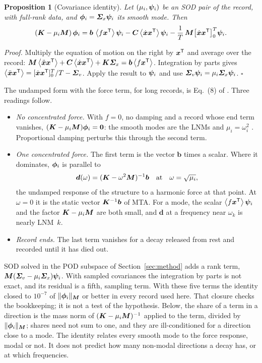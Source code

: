 \documentclass[preprint,12pt]{elsarticle}
\newtheorem{proposition}{Proposition}
\begin{document}
\begin{proposition}[Covariance identity]\label{prop:identity}
Let $(\mu_i,\bm{\psi}_i)$ be an SOD pair of the record, with full-rank data, and $\bm{\phi}_i=\bm{\varSigma}_x\bm{\psi}_i$ its smooth mode. Then
\begin{equation}
(\bm{K}-\mu_i\bm{M})\,\bm{\phi}_i=\bm{b}\,\left\langle f\bm{x}^{\mathsf T} \right\rangle\bm{\psi}_i-\bm{C}\left\langle \dot{\bm{x}}\bm{x}^{\mathsf T} \right\rangle\bm{\psi}_i-\frac1T\,\bm{M}\big[\dot{\bm{x}}\bm{x}^{\mathsf T}\big]_0^T\bm{\psi}_i .
\label{eq:identity}
\end{equation}
\end{proposition}
\noindent\emph{Proof.} Multiply the equation of motion on the right by $\bm{x}^{\mathsf T}$ and average over the record: $\bm{M}\left\langle \ddot{\bm{x}}\bm{x}^{\mathsf T} \right\rangle+\bm{C}\left\langle \dot{\bm{x}}\bm{x}^{\mathsf T} \right\rangle+\bm{K}\bm{\varSigma}_x=\bm{b}\left\langle f\bm{x}^{\mathsf T} \right\rangle$. Integration by parts gives $\left\langle \ddot{\bm{x}}\bm{x}^{\mathsf T} \right\rangle=[\dot{\bm{x}}\bm{x}^{\mathsf T}]_0^T/T-\bm{\varSigma}_v$. Apply the result to $\bm{\psi}_i$ and use $\bm{\varSigma}_v\bm{\psi}_i=\mu_i\bm{\varSigma}_x\bm{\psi}_i$. \hfill$\square$

The undamped form with the force term, for long records, is Eq.~(8) of \citet{Farooq2008}. Three readings follow.
\begin{itemize}
\item \emph{No concentrated force.} With $f=0$, no damping and a record whose end term vanishes, $(\bm{K}-\mu_i\bm{M})\bm{\phi}_i=\mathbf 0$: the smooth modes are the LNMs and $\mu_i=\omega_i^2$ \citep{Chelidze2006}. Proportional damping perturbs this through the second term.
\item \emph{One concentrated force.} The first term is the vector $\bm{b}$ times a scalar. Where it dominates, $\bm{\phi}_i$ is parallel to
\begin{equation}
\bm{d}(\omega)=(\bm{K}-\omega^2\bm{M})^{-1}\bm{b}\quad\text{at}\quad\omega=\sqrt{\mu_i},
\label{eq:d}
\end{equation}
the undamped response of the structure to a harmonic force at that point. At $\omega=0$ it is the static vector $\bm{K}^{-1}\bm{b}$ of MTA. For a mode, the scalar $\left\langle f\bm{x}^{\mathsf T} \right\rangle\bm{\psi}_i$ and the factor $\bm{K}-\mu_i\bm{M}$ are both small, and $\bm{d}$ at a frequency near $\omega_k$ is nearly LNM~$k$.
\item \emph{Record ends.} The last term vanishes for a decay released from rest and recorded until it has died out.
\end{itemize}
SOD solved in the POD subspace of Section~\ref{sec:method} adds a rank term, $\bm{M}(\bm{\varSigma}_v-\mu_i\bm{\varSigma}_x)\bm{\psi}_i$. With sampled covariances the integration by parts is not exact, and its residual is a fifth, sampling term. With these five terms the identity closed to $10^{-7}$ of $\|\bm{\phi}_i\|_{\bm{M}}$ or better in every record used here. That closure checks the bookkeeping; it is not a test of the hypothesis. Below, the share of a term in a direction is the mass norm of $(\bm{K}-\mu_i\bm{M})^{-1}$ applied to the term, divided by $\|\bm{\phi}_i\|_{\bm{M}}$; shares need not sum to one, and they are ill-conditioned for a direction close to a mode.
The identity relates every smooth mode to the force response, modal or not. It does not predict how many non-modal directions a decay has, or at which frequencies.
\end{document}
